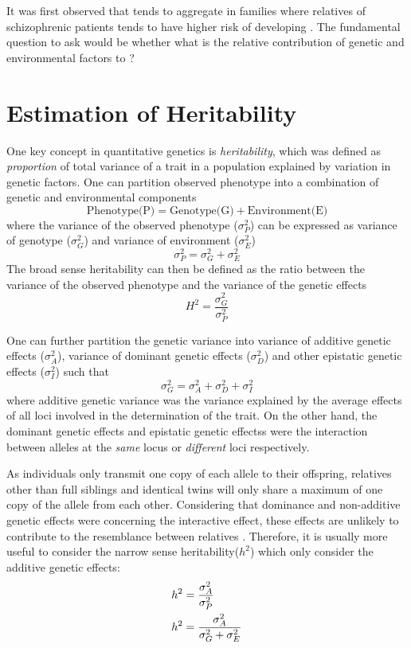\documentclass{book}
\newcommand*{\glng}{\glsentrylong}
\begin{document}
	It was first observed that \glng{scz} tends to aggregate in families where relatives of schizophrenic patients tends to have higher risk of developing \glng{scz}\citep{gottesman1991schizophrenia}.
	The fundamental question to ask would be whether what is the relative contribution of genetic and environmental factors to \glng{scz}?
	
	\section{Estimation of Heritability}

	One key concept in quantitative genetics is \emph{heritability}, which was defined as \emph{proportion} of total variance of a trait in a population explained by variation in genetic factors.
	One can partition observed phenotype into a combination of genetic and environmental components\citep{Falconer1996}
	$$
	\text{Phenotype(P)}=\text{Genotype(G)}+\text{Environment(E)}
	$$
	where the variance of the observed phenotype ($\sigma_P^2$) can be expressed as variance of genotype ($\sigma_G^2$) and variance of environment ($\sigma_E^2$)
	$$
		\sigma_P^2=\sigma_G^2+\sigma_E^2
	$$
	The broad sense heritability can then be defined as the ratio between the variance of the observed phenotype and the variance of the genetic effects
	$$
	H^2=\frac{\sigma_G^2}{\sigma_P^2}
	$$
	
	One can further partition the genetic variance into variance of additive genetic effects ($\sigma_A^2$), variance of dominant genetic effects ($\sigma_D^2$) and other epistatic genetic effects ($\sigma_I^2$) such that
	$$
		\sigma_G^2=\sigma_A^2+\sigma_D^2+\sigma_I^2
	$$
	where additive genetic variance was the variance explained by the average effects of all loci involved in the determination of the trait. 
	On the other hand, the dominant genetic effects and epistatic genetic effectss were the interaction between alleles at the \emph{same} locus or \emph{different} loci respectively.
	
	As individuals only transmit one copy of each allele to their offspring, relatives other than full siblings and identical twins will only share a maximum of one copy of the allele from each other.
	Considering that dominance and non-additive genetic effects were concerning the interactive effect, these effects are unlikely to contribute to the resemblance between relatives \citep{Visscher2008}.
	Therefore, it is usually more useful to consider the narrow sense heritability($h^2$) which only consider the additive genetic effects:
	\begin{align}
	h^2&=\frac{\sigma_A^2}{\sigma_P^2} \notag\\
	h^2&=\frac{\sigma_A^2}{\sigma_G^2+\sigma_E^2}
	\label{eq:narrowHeritability}
	\end{align}
	
\end{document}
